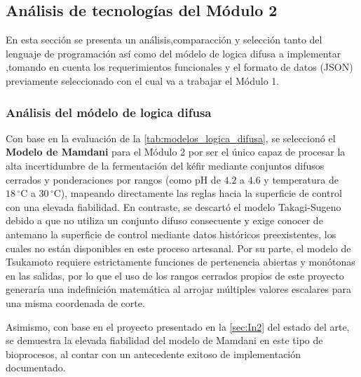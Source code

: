 \subsection{Análisis de tecnologías del Módulo 2}

En esta sección se presenta un análisis,comparacción y selección
tanto del lenguaje de programación así como del módelo de logica difusa a implementar
,tomando en cuenta los requerimientos funcionales y 
el formato de datos (JSON) previamente seleccionado con el cual va a trabajar el Módulo 1.

\subsubsection{Análisis del módelo de logica difusa}

Con base en la evaluación de la \cref{tab:modelos_logica_difusa}, 
se seleccionó el \textbf{Modelo de Mamdani} para el Módulo 2 por 
ser el único capaz de procesar la alta incertidumbre de la fermentación
del kéfir mediante conjuntos difusos cerrados y ponderaciones por 
rangos (como pH de $4.2$ a $4.6$ y temperatura 
de $18\,^{\circ}\text{C}$ a $30\,^{\circ}\text{C}$), 
mapeando directamente las reglas hacia la superficie de control 
con una elevada fiabilidad. En contraste, se descartó 
el modelo Takagi-Sugeno debido a que no utiliza un conjunto difuso 
consecuente y exige conocer de antemano la superficie de control 
mediante datos históricos preexistentes, los cuales no están 
disponibles en este proceso artesanal. Por su parte, 
el modelo de Tsukamoto requiere estrictamente funciones de 
pertenencia abiertas y monótonas en las salidas, por lo que el
uso de los rangos cerrados propios de este proyecto generaría 
una indefinición matemática al arrojar múltiples valores escalares
para una misma coordenada de corte.

Asimismo, con base en el proyecto presentado en la \cref{sec:In2} 
del estado del arte, se demuestra la elevada fiabilidad del modelo 
de Mamdani en este tipo de bioprocesos, al contar con un antecedente 
exitoso de implementación documentado.

